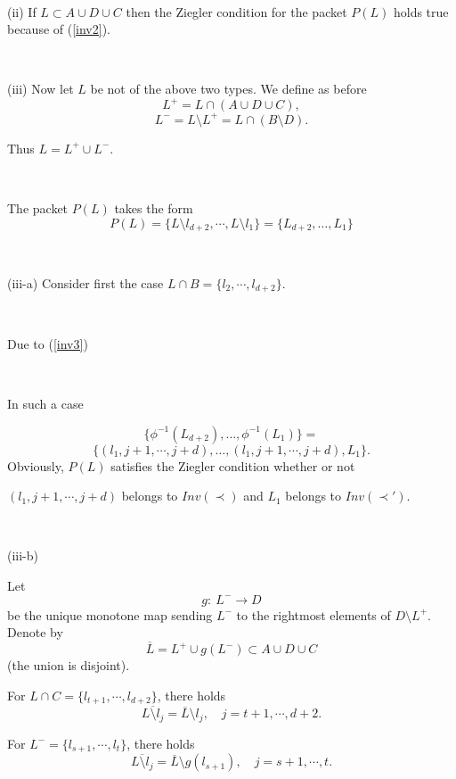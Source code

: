 \documentclass[12pt,a4paper]{article}
\begin{document}
 \
 
 (ii)  If $L \subset A \cup D\cup C$ then the Ziegler condition for the packet $P(L)$ holds true because of (\ref{inv2}).
 
 \
 
 (iii) Now let  $L$ be not of the above two types. We define as before 
 \[
 L^+ = L\cap (A\cup D\cup C),
 \]
 \[
 L^- = L\setminus L^+ = L\cap (B\setminus D).
 \] 
 
Thus $L=L^+\cup L^-$.

\


 The packet  $P(L)$ takes the form 
 \[
 P(L) = \{ L\setminus l_{d+2}, \cdots, L\setminus l_1\} = \{L_{d+2}, \ldots, L_1\}
 \]
 
 
 \
 
(iii-a) Consider first the case $L\cap B=\{l_2, \cdots, l_{d+2}\}$. 

\
 
 Due to (\ref{inv3}) 
 
 \
 
 In  such a case 
 
 \[
 \{\phi^{-1}(L_{d+2}), \ldots, \phi^{-1}(L_{1})\} = 
 \]
 \[
 \{(l_1, j+1, \cdots, j+d), \ldots, (l_1, j+1, \cdots, j+d), L_1\}.
 \]
 Obviously, $P(L)$ satisfies the Ziegler condition whether or not  
 
 $(l_1, j+1, \cdots, j+d)$ belongs to $Inv(\prec)$ and  $L_1$ belongs to $Inv(\prec')$. 
 
 
 
 \
 
 (iii-b)
 
 Let 
 \[
 g:\ L^- \to D  
 \]
 be the unique monotone map sending $L^-$ to the rightmost elements of $D\setminus L^+$. 
 Denote by 
 \[
 \overline L=L^+\cup g(L^-)\subset A\cup D\cup C
 \]
 (the union is disjoint).
 
 
 For $L\cap C=\{ l_{t+1}, \cdots, l_{d+2}\}$, there holds
 \[\overline{L\setminus l_{j}}= \overline L\setminus l_{j}, \quad j=t+1, \cdots, d+2.
 \]
 
For $L^-=\{ l_{s+1}, \cdots , l_{t}\}$, there holds
  \begin{equation}\label{delet1}
  \overline{L\setminus l_{j}}= \overline L\setminus g(l_{s+1}), \quad j=s+1, \cdots, t.
 \end{equation}
 
\end{document}
